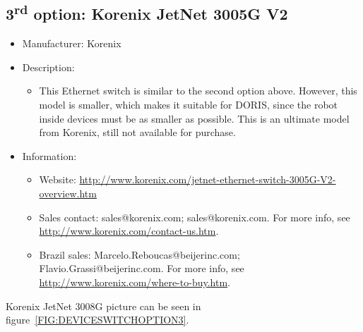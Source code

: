 \subsection{3\textsuperscript{rd} option: Korenix JetNet 3005G V2} \label{DEVICE:ETHERNETSWITCH3005GV2}
\begin{itemize}
  \item Manufacturer: Korenix
  \item Description:
  \begin{itemize}
    \item This Ethernet switch is similar to the second option above. However, this model is smaller, which makes it suitable for DORIS, since the robot inside devices must be as smaller as possible. This is an ultimate model from Korenix, still not available for purchase.
  \end{itemize}
  \item Information:
  \begin{itemize}
    \item Website: \href{http://www.korenix.com/jetnet-ethernet-switch-3005G-V2-overview.htm}{http://www.korenix.com/jetnet-ethernet-switch-3005G-V2-overview.htm}
    \item Sales contact: sales@korenix.com; sales@korenix.com. For more info, see \href{http://www.korenix.com/contact-us.htm}{http://www.korenix.com/contact-us.htm}.
    \item Brazil sales: Marcelo.Reboucas@beijerinc.com; Flavio.Grassi@beijerinc.com. For more info, see \href{http://www.korenix.com/where-to-buy.htm}{http://www.korenix.com/where-to-buy.htm}.
  \end{itemize}
\end{itemize}
Korenix JetNet 3008G picture can be seen in figure~\ref{FIG:DEVICESWITCHOPTION3}.
